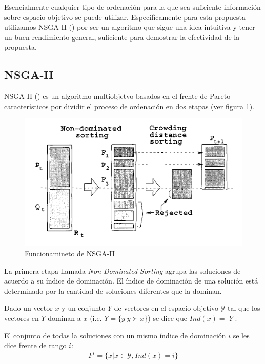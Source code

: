 Esencialmente cualquier tipo de ordenaci\'on para la que sea suficiente informaci\'on sobre espacio objetivo se puede utilizar. Especif\'icamente para esta propuesta utilizamos NSGA-II (\cite{deb2002fast}) por ser un algoritmo que sigue una idea intuitiva y tener un buen rendimiento general, suficiente para demostrar la efectividad de la propuesta.

\subsection{NSGA-II}
NSGA-II (\cite{deb2002fast}) es un algoritmo multiobjetvo basados en el frente de Pareto caracter\'isticos por dividir el proceso de ordenaci\'on en dos etapas (ver figura \ref{proposal:fig:nsga2}).

\begin{figure}[ht]
    \centering
    \includegraphics[scale=0.5]{Pictures/nsga2.png}
    \caption{Funcionamineto de NSGA-II}
    \label{proposal:fig:nsga2}
\end{figure}


La primera etapa llamada \textit{Non Dominated Sorting} agrupa las soluciones de acuerdo a su \'indice de dominaci\'on. El \'indice de dominaci\'on de una soluci\'on est\'a determinado por la cantidad de soluciones diferentes que la dominan.
\begin{definition}
    \label{proposal:def:domination_index}
    Dado un vector $x$ y un conjunto $Y$ de vectores en el espacio objetivo $\mathcal{Y}$ tal que los vectores en $Y$ dominan a $x$ (i.e. $Y = \{y | y \succ x\}$) se dice que $Ind(x) = |Y|$.
\end{definition}
\begin{definition}
    \label{proposal:def:rank_front}
    El conjunto de todas la soluciones con un mismo \'indice de dominaci\'on $i$ se les dice frente de rango $i$:
    \begin{equation*}
         F^i = \{x | x \in \mathcal{Y}, Ind(x) = i\}
    \end{equation*}
\end{definition}

